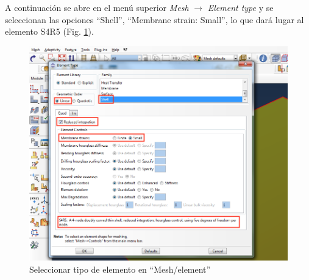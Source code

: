 \documentclass[spanish,a4paper,12pt]{article}
\begin{document}
A continuación se abre en el menú superior \emph{Mesh} $\to$ \emph{Element type} y se seleccionan las opciones ``Shell'', ``Membrane strain: Small'', lo que dará lugar al elemento S4R5 
(Fig. \ref{fig:mesh-element}).
\begin{figure}[h!tp]
\centering
\includegraphics[scale=0.33]{capturas/31-mesh.png}
\caption{Seleccionar tipo de elemento en ``Mesh/element''}
\label{fig:mesh-element}%
\end{figure}
\end{document}
